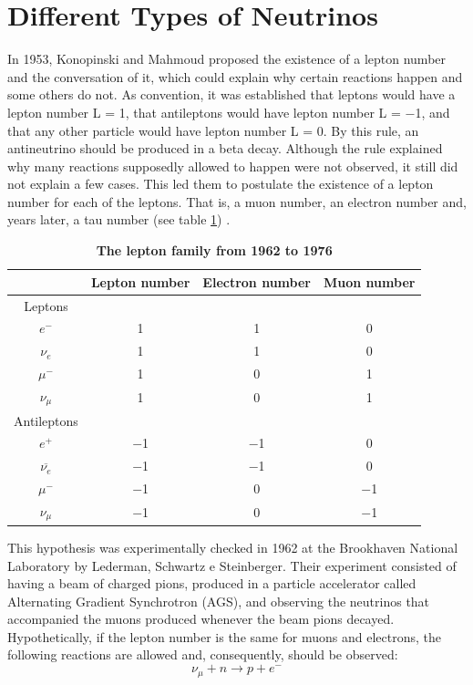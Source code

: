 \section{Different Types of Neutrinos}
In 1953, Konopinski  and Mahmoud proposed the existence of a lepton number and the conversation of it, which could explain why certain reactions happen and some others do not. As convention, it was established that leptons would have a lepton number L = 1, that antileptons would have lepton number L = $-$1, and that any other particle would have lepton number L = 0. By this rule, an antineutrino should be produced in a beta decay. Although the rule explained why many reactions supposedly allowed to happen were not observed, it still did not explain a few cases. This led them to postulate the existence of a lepton number for each of the leptons. That is, a muon number, an electron number and, years later, a tau number (see table \ref{lepton_family}) \cite{Konopinski_Mahmoud}. 
%
\begin{table}
	\begin{center}
		\begin{tabular}{cccc}
			\bottomrule
						& \textbf{Lepton number}	&	\textbf{Electron number}	&	\textbf{Muon number}\\
			\toprule
			Leptons			&		&		&	 \\
			$e^-$			&	1	&	1	&	0\\ 
			$\nu_e$			&	1	&	1	&	0\\
			$\mu^-$			&	1	&	0	&	1\\	
			$\nu_\mu$		&	1	&	0	&	1\\
			Antileptons		&		&		&	  \\
			$e^+$			&	$-$1	&	$-$1	&	0\\	
			$\overline{\nu_e}$	&	$-$1	&	$-$1	&	0\\
			$\mu^-$			&	$-$1	&	0	&	$-$1\\
			$\nu_\mu$		&	$-$1	&	0	&	$-$1\\
			\toprule
		\end{tabular}
		\caption[The lepton family]{{\textbf{The lepton family from 1962 to 1976}} \cite{griffiths}}
		\label{lepton_family}
	\end{center}
\end{table}
\newline

This hypothesis was experimentally checked in 1962 at the Brookhaven National Laboratory by Lederman, Schwartz e Steinberger. Their experiment consisted of having a beam of charged pions, produced in a particle accelerator called Alternating Gradient Synchrotron (AGS), and observing the neutrinos that accompanied the muons produced whenever the beam pions decayed. Hypothetically, if the lepton number is the same for muons and electrons, the following reactions are allowed and, consequently, should be observed: 
%
\begin{equation}
	\nu_{\mu} + n \longrightarrow p + e^-
	\label{lss_primeira}
\end{equation}

